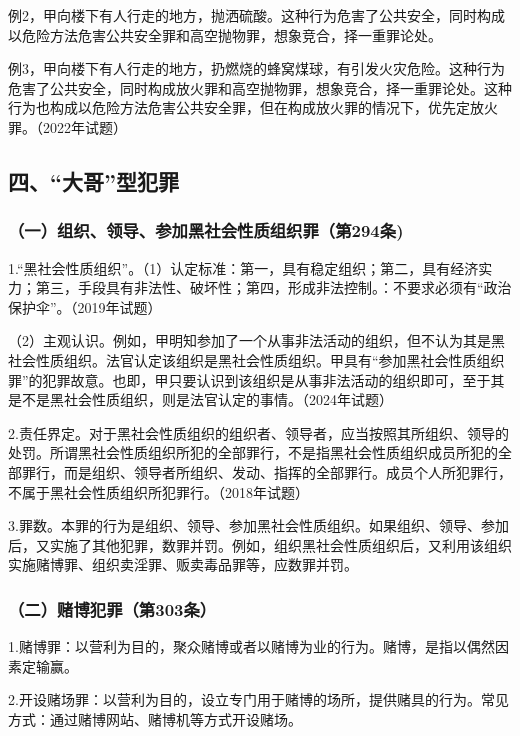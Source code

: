 例2，甲向楼下有人行走的地方，抛洒硫酸。这种行为危害了公共安全，同时构成以危险方法危害公共安全罪和高空抛物罪，想象竞合，择一重罪论处。

例3，甲向楼下有人行走的地方，扔燃烧的蜂窝煤球，有引发火灾危险。这种行为危害了公共安全，同时构成放火罪和高空抛物罪，想象竞合，择一重罪论处。这种行为也构成以危险方法危害公共安全罪，但在构成放火罪的情况下，优先定放火罪。（2022年试题）

\subsection*{四、“大哥”型犯罪}

\subsubsection*{（一）组织、领导、参加黑社会性质组织罪（第294条)}

1.“黑社会性质组织”。（1）认定标准：第一，具有稳定组织；第二，具有经济实力；第三，手段具有非法性、破坏性；第四，形成非法控制。：不要求必须有“政治保护伞”。（2019年试题）

（2）主观认识。例如，甲明知参加了一个从事非法活动的组织，但不认为其是黑社会性质组织。法官认定该组织是黑社会性质组织。甲具有“参加黑社会性质组织罪”的犯罪故意。也即，甲只要认识到该组织是从事非法活动的组织即可，至于其是不是黑社会性质组织，则是法官认定的事情。（2024年试题）

2.责任界定。对于黑社会性质组织的组织者、领导者，应当按照其所组织、领导的处罚。所谓黑社会性质组织所犯的全部罪行，不是指黑社会性质组织成员所犯的全部罪行，而是组织、领导者所组织、发动、指挥的全部罪行。成员个人所犯罪行，不属于黑社会性质组织所犯罪行。（2018年试题）

3.罪数。本罪的行为是组织、领导、参加黑社会性质组织。如果组织、领导、参加后，又实施了其他犯罪，数罪并罚。例如，组织黑社会性质组织后，又利用该组织实施赌博罪、组织卖淫罪、贩卖毒品罪等，应数罪并罚。

\subsubsection*{（二）赌博犯罪（第303条）}

1.赌博罪：以营利为目的，聚众赌博或者以赌博为业的行为。赌博，是指以偶然因素定输赢。

2.开设赌场罪：以营利为目的，设立专门用于赌博的场所，提供赌具的行为。常见方式：通过赌博网站、赌博机等方式开设赌场。

